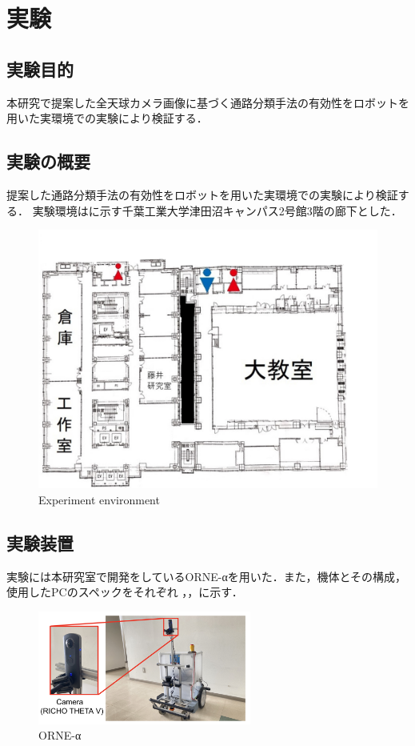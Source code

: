 \documentclass[../main]{subfiles}
\begin{document}
\setcounter{secnumdepth}{3}
    \chapter{実験}
    \section{実験目的}
        本研究で提案した全天球カメラ画像に基づく通路分類手法の有効性をロボットを用いた実環境での実験により検証する．
    \section{実験の概要}
        提案した通路分類手法の有効性をロボットを用いた実環境での実験により検証する．
        実験環境はに示す千葉工業大学津田沼キャンパス2号館3階の廊下とした．
        \begin{figure}[H]
         \centering
         \includegraphics[width=15cm]{../images/MAP_Tsudanuma2-3.png}
         \caption{Experiment environment}
         \label{figure::3floor_map}
        \end{figure}

    \section{実験装置}
        実験には本研究室で開発をしているORNE-αを用いた．また，機体とその構成，使用したPCのスペックをそれぞれ
        ，，に示す．

        \begin{figure}[H]
        \centering
        \includegraphics[width=7cm]{../images/experimental_machine_wide.png}
        \caption{ORNE-α}
        \label{figure::robot_image}
        \end{figure}
\end{document}

